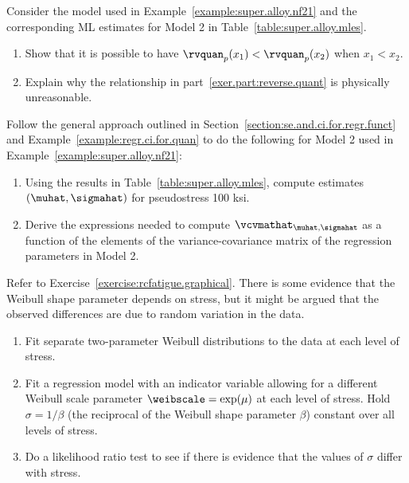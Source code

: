 \begin{exercise}
\label{exercise:reverse.quant}
Consider the model used in Example~\ref{example:super.alloy.nf21} and
the corresponding ML estimates for Model 2 in
Table~\ref{table:super.alloy.mles}. 
\begin{enumerate}
\item
\label{exer.part:reverse.quant}
Show that it is possible
to have $\rvquan_{p}(x_{1}) < \rvquan_{p}(x_{2})$ when $x_{1} <
x_{2}$.
\item
Explain why the relationship in part~\ref{exer.part:reverse.quant}
is physically unreasonable.
\end{enumerate}
\end{exercise}

\begin{exercise1}
Follow the general approach outlined in
Section~\ref{section:se.and.ci.for.regr.funct} and
Example~\ref{example:regr.ci.for.quan} to do the following for Model 2
used in Example~\ref{example:super.alloy.nf21}:
\begin{enumerate}
\item
Using the results in Table~\ref{table:super.alloy.mles}, compute
estimates $(\muhat, \sigmahat)$ for pseudostress 100 ksi.
\item
Derive the expressions needed to compute
$\vcvmathat_{\muhat,\sigmahat}$ as a function of the elements of the
variance-covariance matrix of the regression parameters in Model 2.
\end{enumerate}
\end{exercise1}

\begin{exercise1}
\label{exercise:rcfatigue.sigma.test}
Refer to Exercise~\ref{exercise:rcfatigue.graphical}. There is some
evidence that the Weibull shape parameter depends on
stress, but it might be argued that
the observed differences are due to random variation in the data.
\begin{enumerate}
\item
Fit separate two-parameter Weibull distributions to the data
at each level of stress.
\item
Fit a regression model with an indicator variable allowing for a
different Weibull scale parameter $\weibscale=\exp(\mu)$ at each
level of stress. Hold $\sigma=1/\beta$ (the reciprocal of the
Weibull shape parameter $\beta$) constant over all levels of stress.
\item
Do a likelihood ratio test to see if there is evidence that
the values of $\sigma$ differ with stress.
\end{enumerate}
\end{exercise1}

